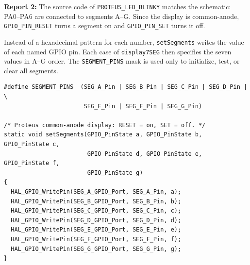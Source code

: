 \textbf{Report 2: } The source code of \texttt{PROTEUS\_LED\_BLINKY} matches the schematic: PA0--PA6 are connected to segments A--G. Since the display is common-anode, \texttt{GPIO\_PIN\_RESET} turns a segment on and \texttt{GPIO\_PIN\_SET} turns it off.

Instead of a hexadecimal pattern for each number, \texttt{setSegments} writes the value of each named GPIO pin. Each case of \texttt{display7SEG} then specifies the seven values in A--G order. The \texttt{SEGMENT\_PINS} mask is used only to initialize, test, or clear all segments.

\begin{lstlisting}[basicstyle=\ttfamily\small,caption={Pin-by-pin display7SEG implementation for the Proteus simulation}]
#define SEGMENT_PINS  (SEG_A_Pin | SEG_B_Pin | SEG_C_Pin | SEG_D_Pin | \
                       SEG_E_Pin | SEG_F_Pin | SEG_G_Pin)

/* Proteus common-anode display: RESET = on, SET = off. */
static void setSegments(GPIO_PinState a, GPIO_PinState b, GPIO_PinState c,
                        GPIO_PinState d, GPIO_PinState e, GPIO_PinState f,
                        GPIO_PinState g)
{
  HAL_GPIO_WritePin(SEG_A_GPIO_Port, SEG_A_Pin, a);
  HAL_GPIO_WritePin(SEG_B_GPIO_Port, SEG_B_Pin, b);
  HAL_GPIO_WritePin(SEG_C_GPIO_Port, SEG_C_Pin, c);
  HAL_GPIO_WritePin(SEG_D_GPIO_Port, SEG_D_Pin, d);
  HAL_GPIO_WritePin(SEG_E_GPIO_Port, SEG_E_Pin, e);
  HAL_GPIO_WritePin(SEG_F_GPIO_Port, SEG_F_Pin, f);
  HAL_GPIO_WritePin(SEG_G_GPIO_Port, SEG_G_Pin, g);
}


\end{lstlisting}
